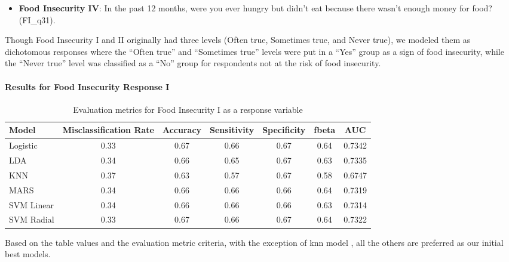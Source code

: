 \documentclass[
  10pt,
]{article}
\providecommand{\tightlist}{%
  \setlength{\itemsep}{0pt}\setlength{\parskip}{0pt}}
\begin{document}
\begin{itemize}
\tightlist
\item
  \textbf{Food Insecurity IV}: In the past 12 months, were you ever hungry but didn't eat because there wasn't enough money for food? (FI\_q31).
\end{itemize}

Though Food Insecurity I and II originally had three levels (Often true, Sometimes true, and Never true), we modeled them as dichotomous responses where the ``Often true'' and ``Sometimes true'' levels were put in a ``Yes'' group as a sign of food insecurity, while the ``Never true'' level was classified as a ``No'' group for respondents not at the risk of food insecurity.

\hypertarget{results-for-food-insecurity-response-i}{%
\paragraph{Results for Food Insecurity Response I}\label{results-for-food-insecurity-response-i}}

\newline

\begin{table}[H]

\caption{\label{tab:unnamed-chunk-17}Evaluation metrics for Food Insecurity I  as a response variable}
\centering
\fontsize{12}{14}\selectfont
\begin{tabular}[t]{lcccccc}
\toprule
Model & Misclassification Rate & Accuracy & Sensitivity & Specificity & fbeta & AUC\\
\midrule
Logistic & 0.33 & 0.67 & 0.66 & 0.67 & 0.64 & 0.7342\\
LDA & 0.34 & 0.66 & 0.65 & 0.67 & 0.63 & 0.7335\\
KNN & 0.37 & 0.63 & 0.57 & 0.67 & 0.58 & 0.6747\\
MARS & 0.34 & 0.66 & 0.66 & 0.66 & 0.64 & 0.7319\\
SVM Linear & 0.34 & 0.66 & 0.66 & 0.66 & 0.63 & 0.7314\\
SVM Radial & 0.33 & 0.67 & 0.66 & 0.67 & 0.64 & 0.7322\\
\bottomrule
\end{tabular}
\end{table}

Based on the table values and the evaluation metric criteria, with the exception of knn model , all the others are preferred as our initial best models.\\
\end{document}
